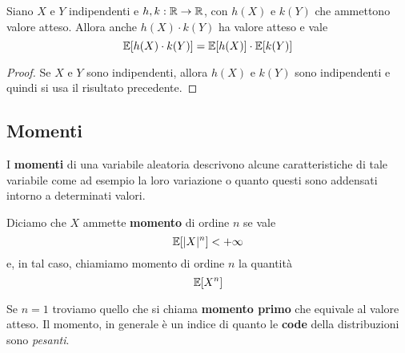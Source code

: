 \begin{corollary}
	Siano $X$ e $Y$ indipendenti e $h,k : \mathbb{R} \to \mathbb{R}$, con $h(X)$ e $k(Y)$ che ammettono valore
	atteso. Allora anche $h(X) \cdot k(Y)$ ha valore atteso e vale
	\[ \mathbb{E}[h(X) \cdot k(Y)] = \mathbb{E}[h(X)] \cdot \mathbb{E}[k(Y)] \]
	\begin{proof}
		Se $X$ e $Y$ sono indipendenti, allora $h(X)$ e $k(Y)$ sono indipendenti e quindi si usa
		il risultato precedente.
	\end{proof}
\end{corollary}

\subsection{Momenti}
I \textbf{momenti} di una variabile aleatoria descrivono alcune caratteristiche di tale variabile
come ad esempio la loro variazione o quanto questi sono addensati intorno a determinati valori.

\begin{definition}
	Diciamo che $X$ ammette \textbf{momento} di ordine $n$ se vale
	\[ \mathbb{E}[|X|^n] < +\infty \]
	e, in tal caso, chiamiamo momento di ordine $n$ la quantità
	\[ \mathbb{E}[X^n] \]
\end{definition}

Se $n=1$ troviamo quello che si chiama \textbf{momento primo} che equivale al valore atteso. Il
momento, in generale è un indice di quanto le \textbf{code} della distribuzioni sono \emph{pesanti}.

